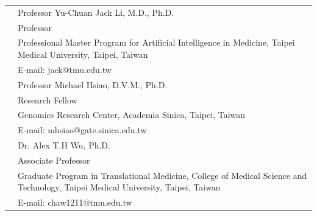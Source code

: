 \documentclass[letterpaper, 11pt]{article}
\begin{document}
\begin{longtable}{p{1.3in}p{4.8in}}
& Professor Yu-Chuan Jack Li, M.D.,  Ph.D.\\
& Professor\\
& Professional Master Program for Artificial Intelligence in Medicine, Taipei Medical University,
Taipei, Taiwan\\
& E-mail: jack@tmu.edu.tw\\[0.5cm]


& Professor Michael Hsiao, D.V.M., Ph.D.\\
& Research Fellow\\
& Genomics Research Center, 
Academia Sinica, Taipei, Taiwan\\
& E-mail: mhsiao@gate.sinica.edu.tw\\[0.5cm]

& Dr. Alex T.H Wu, Ph.D.\\
& Associate Professor\\
& Graduate Program in Translational Medicine,
College of Medical Science and Technology,
Taipei Medical University,
Taipei, Taiwan\\
& E-mail: chaw1211@tmu.edu.tw\\




\end{longtable}


\nohyphens{\color{OliveGreen}{Publications}} 
\printbibliography[heading=none] %

%
\nocite{*}

\end{document}
